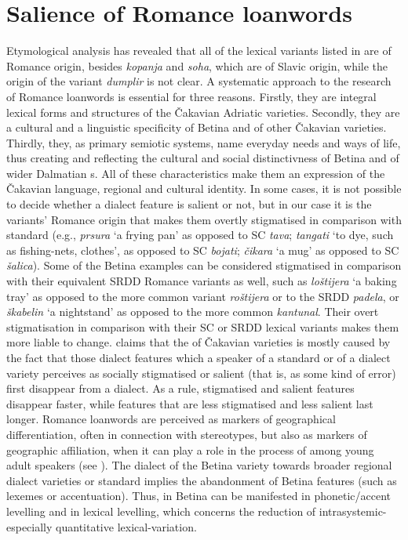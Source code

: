 \documentclass[output=paper]{LSP/langsci}
\begin{document}
\largerpage
\section{Salience of Romance loanwords}
Etymological analysis has revealed that all of the lexical variants listed in  are of Romance origin, besides \textit{kopanja} and \textit{soha}, which are of Slavic origin, while the origin of the variant \textit{dumplir} is not clear. A systematic approach to the research of Romance loanwords is essential for three reasons. Firstly, they are integral lexical forms and structures of the Čakavian  Adriatic varieties. Secondly, they are a cultural and a linguistic specificity of Betina and of other Čakavian varieties. Thirdly, they, as primary semiotic systems, name everyday needs and ways of life, thus creating and reflecting the cultural and social distinctivness of Betina and of wider Dalmatian s. All of these characteristics make them an expression of the Čakavian language, regional and cultural identity. In some cases, it is not possible to decide whether a dialect feature is salient or not, but in our case it is the variants’ Romance origin that makes them overtly stigmatised in comparison with standard  (e.g., \textit{prsura} `a frying pan' as opposed to SC \textit{tava}; \textit{tangati} `to dye, such as fishing-nets, clothes’, as opposed to SC \textit{bojati}; \textit{čikara} ‘a mug’ as opposed to SC \textit{šalica}). Some of the Betina examples can be considered stigmatised in comparison with their equivalent SRDD Romance variants as well, such as \textit{loštijera} ‘a baking tray’ as opposed to the more common variant \textit{roštijera} or to the SRDD \textit{padela}, or \textit{škabelin} ‘a nightstand’ as opposed to the more common \textit{kantunal}. Their overt stigmatisation in comparison with their SC or SRDD lexical variants makes them more liable to change. \citet[30--32]{jutronic_spliski_2010} claims that the  of Čakavian varieties is mostly caused by the fact that those dialect features which a speaker of a standard or of a dialect variety perceives as socially stigmatised or salient (that is, as some kind of error) first disappear from a dialect. As a rule, stigmatised and salient features disappear faster, while features that are less stigmatised and less salient last longer. Romance loanwords are perceived as markers of geographical differentiation, often in connection with stereotypes, but also as markers of geographic affiliation, when it can play a role in the process of  among young adult speakers (see \citealt[44--45]{auer_study_2004}). The dialect  of the Betina variety towards broader regional dialect varieties or standard  implies the abandonment of Betina features (such as lexemes or accentuation). Thus,  in Betina can be manifested in phonetic/accent levelling and in lexical levelling, which concerns the reduction of intrasystemic-especially quantitative lexical-variation.
\end{document}

